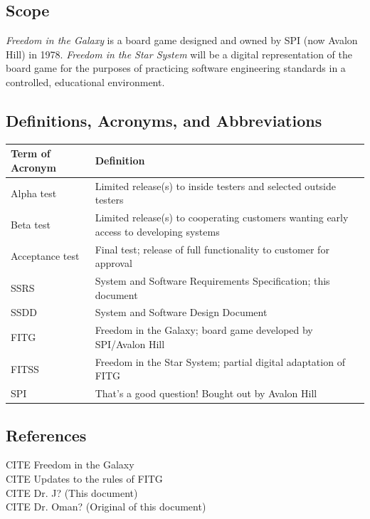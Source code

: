 \documentclass[twoside,letterpaper]{article}
\begin{document}
\subsection{Scope}
\textit{Freedom in the Galaxy} is a board game designed and owned by SPI (now Avalon Hill) in 1978.  \textit{Freedom in the Star System} will be a digital representation of the board game for the purposes of practicing software engineering standards in a controlled, educational environment.

\subsection{Definitions, Acronyms, and Abbreviations}

\begin{minipage}{\linewidth}
\centering
\begin{tabularx}{\textwidth}{lX}\toprule[1.5pt] %

\bf Term of Acronym & \bf Definition\\ \midrule[1.0pt]

Alpha test & Limited release(s) to inside testers and selected outside testers\\
Beta test & Limited release(s) to cooperating customers wanting early access to developing systems\\
Acceptance test & Final test; release of full functionality to customer for approval\\
SSRS & System and Software Requirements Specification; this document\\
SSDD & System and Software Design Document\\
FITG & Freedom in the Galaxy; board game developed by SPI/Avalon Hill\\
FITSS & Freedom in the Star System; partial digital adaptation of FITG\\
SPI & That's a good question! Bought out by Avalon Hill\\

\bottomrule[1.5pt]
\end{tabularx}
\end{minipage}


\subsection{References}
CITE Freedom in the Galaxy \\
CITE Updates to the rules of FITG \\
CITE Dr. J? (This document)\\
CITE Dr. Oman? (Original of this document)
\end{document}
